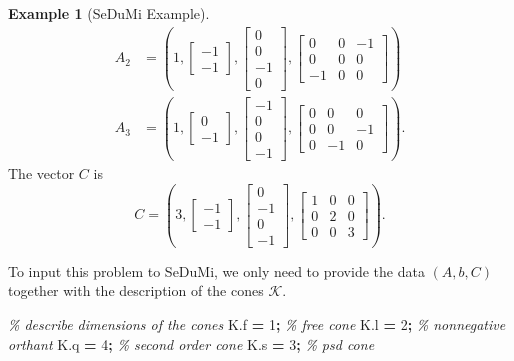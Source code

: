 \documentclass[
]{book}
\newenvironment{Shaded}{\begin{snugshade}}{\end{snugshade}}
\newcommand{\CommentTok}[1]{\textcolor[rgb]{0.56,0.35,0.01}{\textit{#1}}}
\newcommand{\FloatTok}[1]{\textcolor[rgb]{0.00,0.00,0.81}{#1}}
\newcommand{\NormalTok}[1]{#1}
\newcommand{\OperatorTok}[1]{\textcolor[rgb]{0.81,0.36,0.00}{\textbf{#1}}}
\newcommand{\VariableTok}[1]{\textcolor[rgb]{0.00,0.00,0.00}{#1}}
\theoremstyle{definition}
\theoremstyle{definition}
\newtheorem{example}{Example}[chapter]
\theoremstyle{definition}
\theoremstyle{definition}
\theoremstyle{remark}
\begin{document}
\begin{example}[SeDuMi Example]
\begin{equation}
\begin{split}
A_2 &= \left( 1,\begin{bmatrix}-1\\-1\end{bmatrix}, \begin{bmatrix}0\\0\\-1\\0\end{bmatrix},\begin{bmatrix}0&0&-1\\0&0&0\\-1&0&0\end{bmatrix} \right)\\
A_3 &= \left( 1,\begin{bmatrix}0\\-1\end{bmatrix}, \begin{bmatrix}-1\\0\\0\\-1\end{bmatrix},\begin{bmatrix}0&0&0\\0&0&-1\\0&-1&0\end{bmatrix} \right).
\end{split}
\end{equation}
The vector \(C\) is
\[
C = \left( 3,\begin{bmatrix}-1\\-1\end{bmatrix}, \begin{bmatrix}0\\-1\\0\\-1\end{bmatrix},\begin{bmatrix}1&0&0\\0&2&0\\0&0&3\end{bmatrix} \right).
\]

To input this problem to SeDuMi, we only need to provide the data \((A,b,C)\) together with the description of the cones \(\mathcal{K}\).

\begin{Shaded}
\begin{Highlighting}[]
\CommentTok{\% describe dimensions of the cones}
\VariableTok{K}\NormalTok{.}\VariableTok{f} \OperatorTok{=} \FloatTok{1}\OperatorTok{;} \CommentTok{\% free cone}
\VariableTok{K}\NormalTok{.}\VariableTok{l} \OperatorTok{=} \FloatTok{2}\OperatorTok{;} \CommentTok{\% nonnegative orthant}
\VariableTok{K}\NormalTok{.}\VariableTok{q} \OperatorTok{=} \FloatTok{4}\OperatorTok{;} \CommentTok{\% second order cone}
\VariableTok{K}\NormalTok{.}\VariableTok{s} \OperatorTok{=} \FloatTok{3}\OperatorTok{;} \CommentTok{\% psd cone}


\end{Highlighting}
\end{Shaded}
\end{example}
\end{document}
